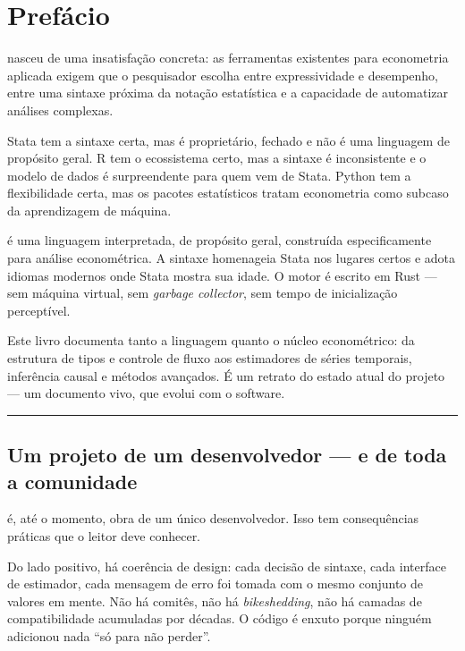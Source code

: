 \chapter*{Prefácio}

\hayashi{} nasceu de uma insatisfação concreta: as ferramentas existentes para econometria
aplicada exigem que o pesquisador escolha entre expressividade e desempenho, entre uma
sintaxe próxima da notação estatística e a capacidade de automatizar análises complexas.

Stata tem a sintaxe certa, mas é proprietário, fechado e não é uma linguagem de propósito
geral. R tem o ecossistema certo, mas a sintaxe é inconsistente e o modelo de dados é
surpreendente para quem vem de Stata. Python tem a flexibilidade certa, mas os pacotes
estatísticos tratam econometria como subcaso da aprendizagem de máquina.

\hayashi{} é uma linguagem interpretada, de propósito geral, construída especificamente
para análise econométrica. A sintaxe homenageia Stata nos lugares certos e adota idiomas
modernos onde Stata mostra sua idade. O motor é escrito em Rust — sem máquina virtual,
sem \textit{garbage collector}, sem tempo de inicialização perceptível.

\bigskip

Este livro documenta tanto a linguagem quanto o núcleo econométrico: da estrutura de
tipos e controle de fluxo aos estimadores de séries temporais, inferência causal e
métodos avançados. É um retrato do estado atual do projeto — um documento vivo, que
evolui com o software.

\bigskip
\noindent\rule{\textwidth}{0.4pt}
\bigskip

\section*{Um projeto de um desenvolvedor — e de toda a comunidade}

\hayashi{} é, até o momento, obra de um único desenvolvedor. Isso tem consequências
práticas que o leitor deve conhecer.

Do lado positivo, há coerência de design: cada decisão de sintaxe, cada interface de
estimador, cada mensagem de erro foi tomada com o mesmo conjunto de valores em mente.
Não há comitês, não há \textit{bikeshedding}, não há camadas de compatibilidade
acumuladas por décadas. O código é enxuto porque ninguém adicionou nada ``só para não
perder''.

